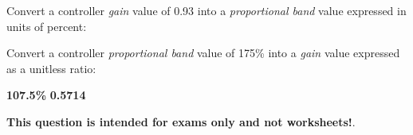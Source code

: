 

Convert a controller {\it gain} value of 0.93 into a {\it proportional band} value expressed in units of percent:

\vskip 20pt

Convert a controller {\it proportional band} value of 175\% into a {\it gain} value expressed as a unitless ratio:







{\bf 107.5\%} \hskip 30pt {\bf 0.5714}







{\bf This question is intended for exams only and not worksheets!}.


